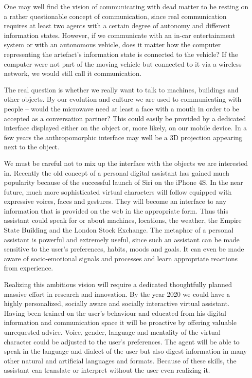 \documentclass[10pt, plain]{../../metanetpaper}
\begin{document}
\begin{multicols}{2}
One may well find the vision of communicating with dead matter to be resting on a rather questionable concept of communication, since real communication requires at least two agents with a certain degree of autonomy and different information states. However, if we communicate with an in-car entertainment system or with an autonomous vehicle, does it matter how the computer representing the artefact’s information state is connected to the vehicle? If the computer were not part of the moving vehicle but connected to it via a wireless network, we would still call it communication.
 
The real question is whether we really want to talk to machines, buildings and other objects. By our evolution and culture we are used to communicating with people – would the microwave need at least a face with a mouth in order to be accepted as a conversation partner? This could easily be provided by a dedicated interface displayed either on the object or, more likely, on our mobile device. In a few years the anthropomorphic interface may well be a 3D projection appearing next to the object.
 
We must be careful not to mix up the interface with the objects we are interested in. Recently the old concept of a personal digital assistant has gained much popularity because of the successful launch of Siri on the iPhone 4S. In the near future, much more sophisticated virtual characters will follow equipped with expressive voices, faces and gestures. They will become an interface to any information that is provided on the web in the appropriate form. Thus this assistant could speak for or about machines, locations, the weather, the Empire State Building and the London Stock Exchange. The metaphor of a personal assistant is powerful and extremely useful, since such an assistant can be made sensitive to the user’s preferences, habits, moods and goals. It can even be made aware of socio-emotional signals and processes and learn appropriate reactions from experience.  
 
Realizing this ambitious vision will require a dedicated thoughtfully planned massive effort in research and innovation. By the year 2020 we could have a highly personalized, socially aware and socially interactive virtual assistant. Having been trained on the user’s behaviour and educated from his digital information and communication space it will be proactive by offering valuable unrequested advice. Voice, gender, language and mentality of the virtual character could be adjusted to the user’s preferences.  The agent will be able to speak in the language and dialect of the user but also digest information in many other natural and artificial languages and formats. Because of these skills, the assistant can translate or interpret without the user even realizing it.
 

\end{multicols}
\end{document}
